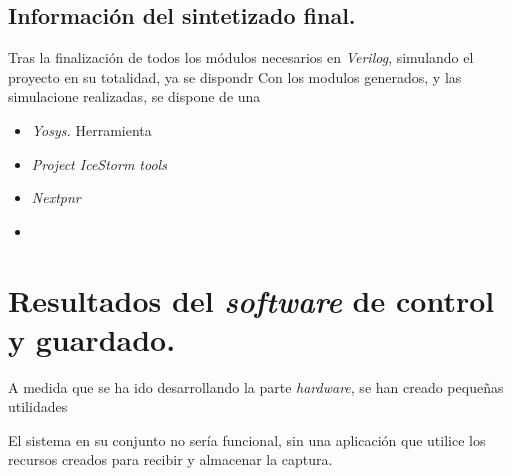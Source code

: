 \subsection{Información del sintetizado final.}
Tras la finalización de todos los módulos necesarios en \emph{Verilog}, simulando el proyecto en su totalidad, ya se dispondr
Con los modulos generados, y las simulacione realizadas, se dispone de una 
\begin{itemize}
    \item \emph{Yosys.} Herramienta
    \item \emph{Project IceStorm tools}
    \item \emph{Nextpnr}
\end{itemize}
\begin{itemize}
    \item 
\end{itemize}


\section{Resultados del \emph{software} de control y guardado.}
A medida que se ha ido desarrollando la parte \emph{hardware}, se han creado pequeñas utilidades 


 El sistema en su conjunto no sería funcional, sin una aplicación que utilice los recursos creados para recibir y almacenar la captura.




